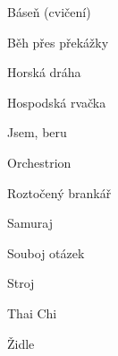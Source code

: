 \large{Báseň (cvičení)}

\large{Běh přes překážky}

\large{Horská dráha}

\large{Hospodská rvačka}

\large{Jsem, beru}

\large{Orchestrion}

\large{Roztočený brankář}

\large{Samuraj}

\large{Souboj otázek}

\large{Stroj}

\large{Thai Chi}

\large{Židle}
